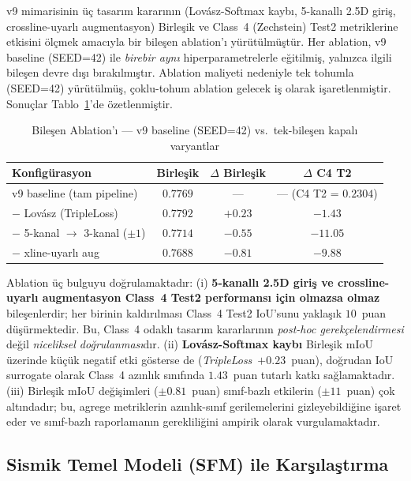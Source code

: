 \documentclass[conference,a4paper,10pt]{IEEEtran}
\begin{document}
v9 mimarisinin üç tasarım kararının (Lovász-Softmax kaybı, 5-kanallı 2.5D
giriş, crossline-uyarlı augmentasyon) Birleşik ve Class~4 (Zechstein)
Test2 metriklerine etkisini ölçmek amacıyla bir bileşen ablation'ı
yürütülmüştür. Her ablation, v9 baseline (SEED=42) ile \emph{birebir aynı}
hiperparametrelerle eğitilmiş, yalnızca ilgili bileşen devre dışı
bırakılmıştır. Ablation maliyeti nedeniyle tek tohumla (SEED=42)
yürütülmüş, çoklu-tohum ablation gelecek iş olarak işaretlenmiştir.
Sonuçlar Tablo~\ref{tab:ablation}'de özetlenmiştir.

\begin{table}[!t]
\renewcommand{\arraystretch}{1.2}
\caption{Bileşen Ablation'ı --- v9 baseline (SEED=42) vs.\ tek-bileşen kapalı varyantlar}
\label{tab:ablation}
\centering
\begin{tabular}{lccc}
\toprule
\textbf{Konfigürasyon} & \textbf{Birleşik} & \textbf{$\Delta$ Birleşik} & \textbf{$\Delta$ C4 T2} \\
\midrule
v9 baseline (tam pipeline) & $0.7769$ & --- & --- (C4 T2 = $0.2304$) \\
$-$ Lovász (TripleLoss)    & $0.7792$ & $+0.23$ & $-1.43$ \\
$-$ 5-kanal $\rightarrow$ 3-kanal ($\pm 1$) & $0.7714$ & $-0.55$ & $\mathbf{-11.05}$ \\
$-$ xline-uyarlı aug       & $0.7688$ & $-0.81$ & $\mathbf{-9.88}$ \\
\bottomrule
\end{tabular}
\end{table}

Ablation üç bulguyu doğrulamaktadır: (i) \textbf{5-kanallı 2.5D giriş ve
crossline-uyarlı augmentasyon Class~4 Test2 performansı için olmazsa
olmaz} bileşenlerdir; her birinin kaldırılması Class~4 Test2 IoU'sunu
yaklaşık $10$~puan düşürmektedir. Bu, Class~4 odaklı tasarım kararlarının
\emph{post-hoc gerekçelendirmesi} değil \emph{niceliksel doğrulanması}dır.
(ii) \textbf{Lovász-Softmax kaybı} Birleşik mIoU üzerinde küçük negatif
etki gösterse de (\emph{TripleLoss}~$+0.23$~puan), doğrudan IoU surrogate
olarak Class~4 azınlık sınıfında $1.43$~puan tutarlı katkı sağlamaktadır.
(iii) Birleşik mIoU değişimleri ($\pm 0.81$~puan) sınıf-bazlı etkilerin
($\pm 11$~puan) çok altındadır; bu, agrege metriklerin azınlık-sınıf
gerilemelerini gizleyebildiğine işaret eder ve sınıf-bazlı raporlamanın
gerekliliğini ampirik olarak vurgulamaktadır.

\subsection{Sismik Temel Modeli (SFM) ile Karşılaştırma}
\label{sec:sfm}
\end{document}
